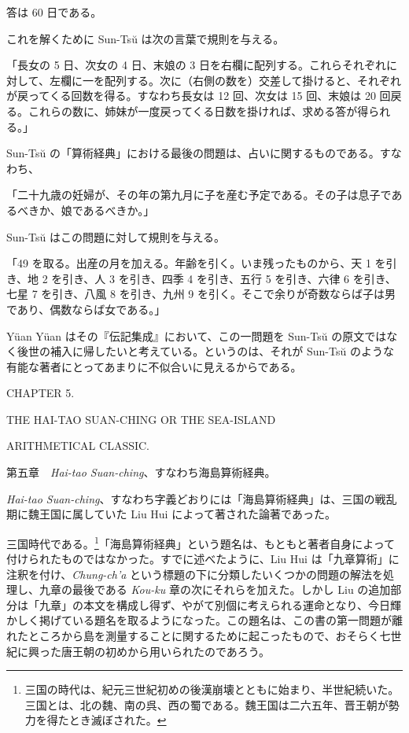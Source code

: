 \documentclass[11pt]{article}
\newcommand{\scanpage}[2]{\clearpage\setcounter{footnote}{0}\noindent{\footnotesize\color{gray}PDF #1 頁 · #2}\par\medskip}
\newcommand{\scanfooter}{}
\begin{document}
答は 60 日である。

これを解くために Sun-Tsŭ は次の言葉で規則を与える。

「長女の 5 日、次女の 4 日、末娘の 3 日を右欄に配列する。これらそれぞれに対して、左欄に一を配列する。次に（右側の数を）交差して掛けると、それぞれが戻ってくる回数を得る。すなわち長女は 12 回、次女は 15 回、末娘は 20 回戻る。これらの数に、姉妹が一度戻ってくる日数を掛ければ、求める答が得られる。」

Sun-Tsŭ の「算術経典」における最後の問題は、占いに関するものである。すなわち、

「二十九歳の妊婦が、その年の第九月に子を産む予定である。その子は息子であるべきか、娘であるべきか。」

Sun-Tsŭ はこの問題に対して規則を与える。

「49 を取る。出産の月を加える。年齢を引く。いま残ったものから、天 1 を引き、地 2 を引き、人 3 を引き、四季 4 を引き、五行 5 を引き、六律 6 を引き、七星 7 を引き、八風 8 を引き、九州 9 を引く。そこで余りが奇数ならば子は男であり、偶数ならば女である。」

Yüan Yüan はその『伝記集成』において、この一問題を Sun-Tsŭ の原文ではなく後世の補入に帰したいと考えている。というのは、それが Sun-Tsŭ のような有能な著者にとってあまりに不似合いに見えるからである。

\begin{center}
CHAPTER 5.\par
\medskip
THE HAI-TAO SUAN-CHING OR THE SEA-ISLAND\par
ARITHMETICAL CLASSIC.\par
\medskip
第五章　\emph{Hai-tao Suan-ching}、すなわち海島算術経典。
\end{center}

\emph{Hai-tao Suan-ching}、すなわち字義どおりには「海島算術経典」は、三国の戦乱期に魏王国に属していた Liu Hui によって著された論著であった。

\scanfooter

\scanpage{0048}{第一部、印刷頁34}

三国時代である。\footnote{三国の時代は、紀元三世紀初めの後漢崩壊とともに始まり、半世紀続いた。三国とは、北の魏、南の呉、西の蜀である。魏王国は二六五年、晋王朝が勢力を得たとき滅ぼされた。}「海島算術経典」という題名は、もともと著者自身によって付けられたものではなかった。すでに述べたように、Liu Hui は「九章算術」に注釈を付け、\emph{Chung-ch'a} という標題の下に分類したいくつかの問題の解法を処理し、九章の最後である \emph{Kou-ku} 章の次にそれらを加えた。しかし Liu の追加部分は「九章」の本文を構成し得ず、やがて別個に考えられる運命となり、今日輝かしく掲げている題名を取るようになった。この題名は、この書の第一問題が離れたところから島を測量することに関するために起こったもので、おそらく七世紀に興った唐王朝の初めから用いられたのであろう。
\end{document}
